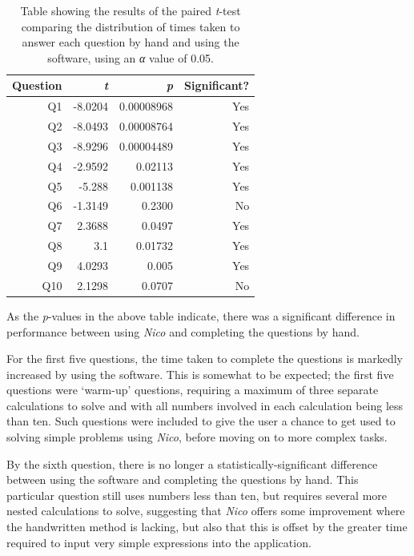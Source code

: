 \documentclass[12pt,twoside,notitlepage,xetex]{report}
\begin{document}
\begin{center}
\begin{table}[H]
\begin{center}
\begin{tabular}{|r|r|r|r|}
\hline
Question & \emph{t} & \emph{p} & Significant?\\ \hline \hline
Q1 & -8.0204 & 0.00008968 & Yes\\ \hline
Q2 & -8.0493 & 0.00008764 & Yes\\ \hline
Q3 & -8.9296 & 0.00004489 & Yes\\ \hline
Q4 & -2.9592 & 0.02113 & Yes\\ \hline
Q5 & -5.288 & 0.001138 & Yes\\ \hline
Q6 & -1.3149 & 0.2300 & No\\ \hline
Q7 & 2.3688 & 0.0497 & Yes\\ \hline
Q8 & 3.1 & 0.01732 & Yes\\ \hline
Q9 & 4.0293 & 0.005 & Yes\\ \hline
Q10 & 2.1298 & 0.0707 & No\\
\hline
\end{tabular}
\end{center}
\caption{Table showing the results of the paired \emph{t}-test comparing the distribution of times taken to answer each question by hand and using the software, using an \emph{α} value of 0.05.}
\label{tab:TTests}
\end{table}
\end{center}

As the \emph{p}-values in the above table indicate, there was a significant difference in performance between using \emph{Nico} and completing the questions by hand.

For the first five questions, the time taken to complete the questions is markedly increased by using the software.  This is somewhat to be expected;  the first five questions were `warm-up' questions, requiring a maximum of three separate calculations to solve and with all numbers involved in each calculation being less than ten.  Such questions were included to give the user a chance to get used to solving simple problems using \emph{Nico}, before moving on to more complex tasks.

By the sixth question, there is no longer a statistically-significant difference between using the software and completing the questions by hand.  This particular question still uses numbers less than ten, but requires several more nested calculations to solve, suggesting that \emph{Nico} offers some improvement where the handwritten method is lacking, but also that this is offset by the greater time required to input very simple expressions into the application.
\end{document}
